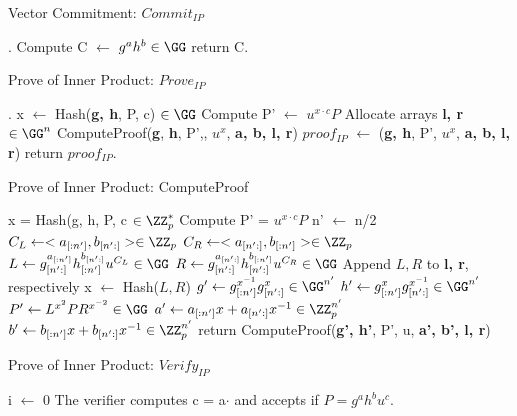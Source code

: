 \begin{algorithm}
 \DontPrintSemicolon
    \caption{Vector Commitment: $Commit_{IP}$}
    \label{alg:vector_commitment}
    \LinesNumbered
    
    .
    Compute C $\gets$ $g^ah^b \in \GG$ \;
    return C.
\end{algorithm}

\begin{algorithm}
 \DontPrintSemicolon
    \caption{Prove of Inner Product: $Prove_{IP}$}
    \label{alg:prove_ip}
    \LinesNumbered
    
    .
    x $\gets$ Hash(\textbf{g, h}, P, c) $\in \GG$ \;
    Compute P' $\gets$ $u^{x\cdot c}P$ \;
    Allocate arrays \textbf{l, r} $\in \GG^n$ \;
    ComputeProof(\textbf{g}, \textbf{h}, P',, $u^x$, \textbf{a, b, l, r})\;
    $proof_{IP}$ $\gets$ (\textbf{g, h}, P', $u^x$, \textbf{a, b, l, r}) \; 
    return $proof_{IP}$.
\end{algorithm}

\begin{algorithm}
    \caption{Prove of Inner Product: ComputeProof}
    \label{alg:compute_proof}
    \LinesNumbered
    x = Hash(g, h, P, c $\in \ZZ_p^*$\;
    Compute P' = $u^{x\cdot c}P$ \;
     {
        n' $\gets$ n/2 \;
        $C_L \gets <a_{[:n']}, b_{[n':]}> \in \ZZ_p$\;
        $C_R \gets <a_{[n':]}, b_{[:n']}> \in \ZZ_p$\;
        $L \gets g_{[n':]}^{a_{[:n']}} h_{[:n']}^{b_{[n':]}}u^{C_L} \in \GG$ \;
        $R \gets g_{[n':]}^{a_{[n':]}} h_{[n':]}^{b_{[:n']}}u^{C_R} \in \GG$ \;
        Append $L, R$ to \textbf{l, r}, respectively\;
        x $\gets$ Hash($L, R$)\;
        $g' \gets g_{[:n']}^{x^{-1}} g_{[n':]}^{x} \in \GG^{n'}$ \;
        $h' \gets g_{[:n']}^{x} g_{[n':]}^{x^{-1}} \in \GG^{n'}$ \;
        $P' \gets L^{x^2}PR^{x^{-2}} \in \GG$ \;
        $a' \gets a_{[:n']}x + a_{[n':]}x^{-1} \in \ZZ_p^{n'}$ \;
        $b' \gets b_{[:n']}x + b_{[n':]}x^{-1} \in \ZZ_p^{n'}$ \;
        return ComputeProof(\textbf{g', h'}, P', u, \textbf{a', b', l, r})
    }
\end{algorithm}

\begin{algorithm}
 \DontPrintSemicolon
    \caption{Prove of Inner Product: $Verify_{IP}$}
    \label{alg:verify_ip}
    \LinesNumbered
    
    
    i $\gets$ 0 \;
    The verifier computes c = a$\cdot$ and accepts if $P = g^ah^bu^c$.
\end{algorithm}

